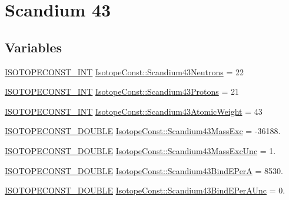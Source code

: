 \hypertarget{group___isotope_const-_scandium-_sc43}{}\section{Scandium 43}
\label{group___isotope_const-_scandium-_sc43}
\subsection*{Variables}
\begin{DoxyCompactItemize}
\item 
\mbox{\hyperlink{group___isotope_const-_macros_ga5f18360b3e99483a35c32d789e62621c}{I\+S\+O\+T\+O\+P\+E\+C\+O\+N\+S\+T\+\_\+\+I\+NT}} \mbox{\hyperlink{group___isotope_const-_scandium-_sc43_ga3982cee31012f8617db84165e8c1d714}{Isotope\+Const\+::\+Scandium43\+Neutrons}} = 22
\item 
\mbox{\hyperlink{group___isotope_const-_macros_ga5f18360b3e99483a35c32d789e62621c}{I\+S\+O\+T\+O\+P\+E\+C\+O\+N\+S\+T\+\_\+\+I\+NT}} \mbox{\hyperlink{group___isotope_const-_scandium-_sc43_ga509cae9af68a6b377d8c6e82f0267c84}{Isotope\+Const\+::\+Scandium43\+Protons}} = 21
\item 
\mbox{\hyperlink{group___isotope_const-_macros_ga5f18360b3e99483a35c32d789e62621c}{I\+S\+O\+T\+O\+P\+E\+C\+O\+N\+S\+T\+\_\+\+I\+NT}} \mbox{\hyperlink{group___isotope_const-_scandium-_sc43_ga634a9aad13794cb03002ecea10498ceb}{Isotope\+Const\+::\+Scandium43\+Atomic\+Weight}} = 43
\item 
\mbox{\hyperlink{group___isotope_const-_macros_ga8f45a7272ce02c0b4c65c44636ed719a}{I\+S\+O\+T\+O\+P\+E\+C\+O\+N\+S\+T\+\_\+\+D\+O\+U\+B\+LE}} \mbox{\hyperlink{group___isotope_const-_scandium-_sc43_ga792a137433a7f858295d863c9968dd53}{Isotope\+Const\+::\+Scandium43\+Mass\+Exc}} = -\/36188.
\item 
\mbox{\hyperlink{group___isotope_const-_macros_ga8f45a7272ce02c0b4c65c44636ed719a}{I\+S\+O\+T\+O\+P\+E\+C\+O\+N\+S\+T\+\_\+\+D\+O\+U\+B\+LE}} \mbox{\hyperlink{group___isotope_const-_scandium-_sc43_ga9d473122151e6fc16c9278f8984932ed}{Isotope\+Const\+::\+Scandium43\+Mass\+Exc\+Unc}} = 1.
\item 
\mbox{\hyperlink{group___isotope_const-_macros_ga8f45a7272ce02c0b4c65c44636ed719a}{I\+S\+O\+T\+O\+P\+E\+C\+O\+N\+S\+T\+\_\+\+D\+O\+U\+B\+LE}} \mbox{\hyperlink{group___isotope_const-_scandium-_sc43_ga494c942a1faf548e272c47cb4bc4f01b}{Isotope\+Const\+::\+Scandium43\+Bind\+E\+PerA}} = 8530.
\item 
\mbox{\hyperlink{group___isotope_const-_macros_ga8f45a7272ce02c0b4c65c44636ed719a}{I\+S\+O\+T\+O\+P\+E\+C\+O\+N\+S\+T\+\_\+\+D\+O\+U\+B\+LE}} \mbox{\hyperlink{group___isotope_const-_scandium-_sc43_gad0220bff38af76125d32a15f9409633f}{Isotope\+Const\+::\+Scandium43\+Bind\+E\+Per\+A\+Unc}} = 0.

\end{DoxyCompactItemize}
